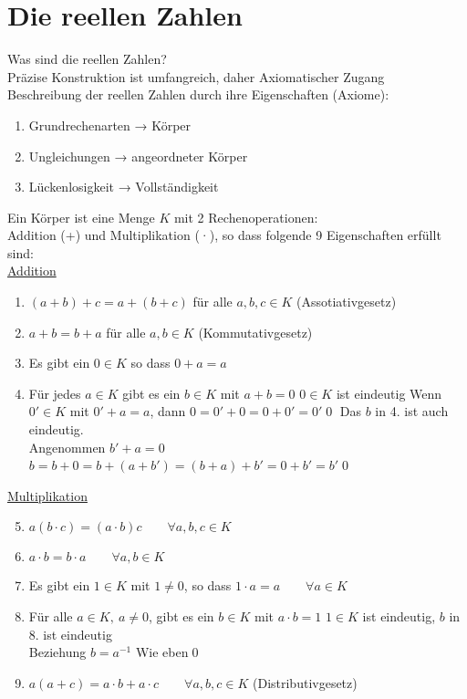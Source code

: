 \chapter{Die reellen Zahlen}
Was sind die reellen Zahlen?\\
Präzise Konstruktion ist umfangreich, daher Axiomatischer Zugang\\
Beschreibung der reellen Zahlen durch ihre Eigenschaften (Axiome):\\
\begin{enumerate}
\item{Grundrechenarten → Körper}
\item{Ungleichungen → angeordneter Körper}
\item{Lückenlosigkeit → Vollständigkeit}
\end{enumerate}
%
\Def
Ein Körper ist eine Menge $K$ mit 2 Rechenoperationen:\\
Addition (+) und Multiplikation (·), so dass folgende 9 Eigenschaften erfüllt sind:\\[8pt]
\underline{Addition}\\[-15pt]
\begin{enumerate}
\item{$(a+b)+c=a+(b+c)$ für alle $a,b,c\in K$ (Assotiativgesetz)}
\item{$a+b=b+a$ für alle $a,b\in K$ (Kommutativgesetz)}
\item{Es gibt ein $0\in K$ so dass $0+a=a$}
\item{Für jedes $a\in K$ gibt es ein $b\in K$ mit $a+b=0$}
\bem
$0\in K$ ist eindeutig
\bew
Wenn $0'\in K$ mit $0'+a=a$, dann $0=0'+0=0+0'=0'$\qed
\bem
Das $b$ in 4. ist auch eindeutig.\\
\bew
Angenommen $b'+a=0$\\
$b=b+0=b+(a+b')=(b+a)+b'=0+b'=b'$\qed
\end{enumerate}
\underline{Multiplikation}\\[-15pt]
\begin{enumerate}
\setcounter{enumi}{4}
\item{$a(b·c)=(a·b)c\qquad ∀a,b,c\in K$}
\item{$a·b=b·a\qquad ∀a,b\in K$}
\item{Es gibt ein $1\in K$ mit $1\neq 0$, so dass $1·a=a\qquad ∀a\in K$}
\item{Für alle $a\in K,\ a\neq 0$, gibt es ein $b\in K$ mit $a·b=1$}
\bem
$1\in K$ ist eindeutig, $b$ in 8. ist eindeutig\\
Beziehung $b=a^{-1}$
\bew
Wie eben\qed
\item{$a(a+c)=a·b+a·c\qquad ∀a,b,c\in K$ (Distributivgesetz)}
\end{enumerate}
